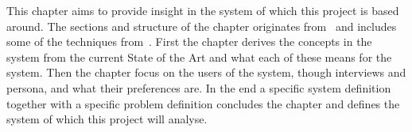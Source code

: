 This chapter aims to provide insight in the system of which this project is based around. The sections and structure of the chapter originates from~\cite{mathiassen2001objektorienteret} and includes some of the techniques from~\cite{benyon2013designing}. First the chapter derives the concepts in the system from the current State of the Art and what each of these means for the system. Then the chapter focus on the users of the system, though interviews and persona, and what their preferences are. In the end a specific system definition together with a specific problem definition concludes the chapter and defines the system of which this project will analyse.